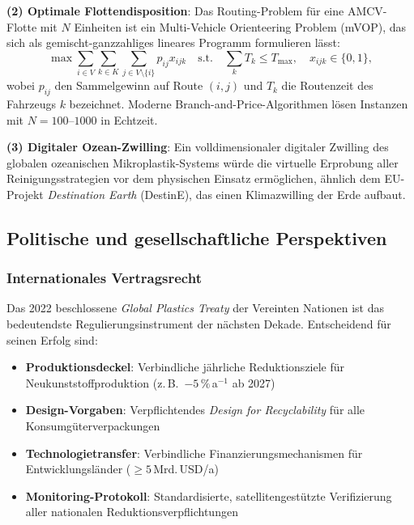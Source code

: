 ﻿\documentclass[12pt,a4paper]{article}
\theoremstyle{definition}
\theoremstyle{remark}
\newcommand{\MP}{Mikroplastik}
\begin{document}
\textbf{(2) Optimale Flottendisposition}: Das Routing-Problem f\"ur
eine AMCV-Flotte mit $N$ Einheiten ist ein Multi-Vehicle Orienteering
Problem (mVOP), das sich als gemischt-ganzzahliges lineares Programm formulieren l\"asst:
\begin{equation}
  \max \sum_{i \in V} \sum_{k \in K} \sum_{j \in V \setminus \{i\}} p_{ij} x_{ijk}
  \quad \text{s.t.} \quad \sum_{k} T_k \leq T_{\max}, \quad x_{ijk} \in \{0,1\},
\end{equation}
wobei $p_{ij}$ den Sammelgewinn auf Route $(i,j)$ und $T_k$ die Routenzeit des
Fahrzeugs $k$ bezeichnet. Moderne Branch-and-Price-Algorithmen l\"osen Instanzen
mit $N = 100$--$1000$ in Echtzeit.

\textbf{(3) Digitaler Ozean-Zwilling}: Ein volldimensionaler digitaler Zwilling
des globalen ozeanischen \MP{}-Systems w\"urde die virtuelle Erprobung aller
Reinigungsstrategien vor dem physischen Einsatz erm\"oglichen, \"ahnlich dem
EU-Projekt \textit{Destination Earth} (DestinE), das einen
Klimazwilling der Erde aufbaut.

\subsection{Politische und gesellschaftliche Perspektiven}

\subsubsection{Internationales Vertragsrecht}

Das 2022 beschlossene \textit{Global Plastics Treaty} der Vereinten Nationen
ist das bedeutendste Regulierungsinstrument der n\"achsten Dekade.
Entscheidend f\"ur seinen Erfolg sind:
\begin{itemize}
  \item \textbf{Produktionsdeckel}: Verbindliche j\"ahrliche Reduktionsziele
        f\"ur Neukunststoffproduktion (z.\,B.\ $-5\,\%$\,a$^{-1}$ ab 2027)
  \item \textbf{Design-Vorgaben}: Verpflichtendes \textit{Design for Recyclability}
        f\"ur alle Konsumgüterverpackungen
  \item \textbf{Technologietransfer}: Verbindliche Finanzierungsmechanismen
        f\"ur Entwicklungsländer ($\geq 5$\,Mrd.\,USD/a)
  \item \textbf{Monitoring-Protokoll}: Standardisierte, satellitengest\"utzte
        Verifizierung aller nationalen Reduktionsverpflichtungen
\end{itemize}
\end{document}
